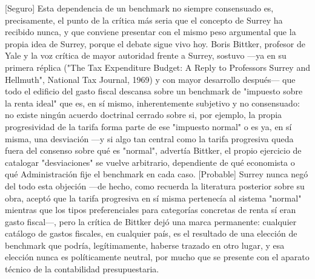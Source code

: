 \documentclass[10pt,a4paper]{article}
\begin{document}
[Seguro] Esta dependencia de un benchmark no siempre consensuado es, precisamente, el punto de la crítica más seria que el concepto de Surrey ha recibido nunca, y que conviene presentar con el mismo peso argumental que la propia idea de Surrey, porque el debate sigue vivo hoy. Boris Bittker, profesor de Yale y la voz crítica de mayor autoridad frente a Surrey, sostuvo —ya en su primera réplica ("The Tax Expenditure Budget: A Reply to Professors Surrey and Hellmuth", National Tax Journal, 1969) y con mayor desarrollo después— que todo el edificio del gasto fiscal descansa sobre un benchmark de "impuesto sobre la renta ideal" que es, en sí mismo, inherentemente subjetivo y no consensuado: no existe ningún acuerdo doctrinal cerrado sobre si, por ejemplo, la propia progresividad de la tarifa forma parte de ese "impuesto normal" o es ya, en sí misma, una desviación —y si algo tan central como la tarifa progresiva queda fuera del consenso sobre qué es "normal", advertía Bittker, el propio ejercicio de catalogar "desviaciones" se vuelve arbitrario, dependiente de qué economista o qué Administración fije el benchmark en cada caso. [Probable] Surrey nunca negó del todo esta objeción —de hecho, como recuerda la literatura posterior sobre su obra, aceptó que la tarifa progresiva en sí misma pertenecía al sistema "normal" mientras que los tipos preferenciales para categorías concretas de renta sí eran gasto fiscal—, pero la crítica de Bittker dejó una marca permanente: cualquier catálogo de gastos fiscales, en cualquier país, es el resultado de una elección de benchmark que podría, legítimamente, haberse trazado en otro lugar, y esa elección nunca es políticamente neutral, por mucho que se presente con el aparato técnico de la contabilidad presupuestaria.
\end{document}
